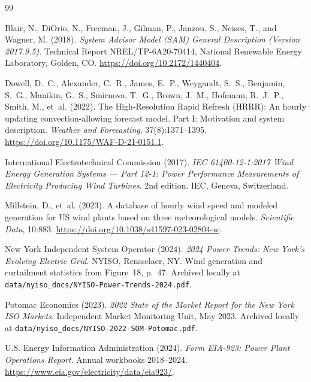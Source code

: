 \documentclass[11pt]{article}
\newcommand{\code}[1]{\texttt{\small #1}}
\begin{document}
\begin{thebibliography}{99}

Blair, N., DiOrio, N., Freeman, J., Gilman, P., Janzou, S., Neises,
T., and Wagner, M. (2018).
\emph{System Advisor Model (SAM) General Description (Version
2017.9.5)}.
Technical Report NREL/TP-6A20-70414, National Renewable Energy
Laboratory, Golden, CO.
\url{https://doi.org/10.2172/1440404}.

Dowell, D.~C., Alexander, C.~R., James, E.~P., Weygandt, S.~S.,
Benjamin, S.~G., Manikin, G.~S., Smirnova, T.~G., Brown, J.~M.,
Hofmann, R.~J.~P., Smith, M., et~al. (2022).
The High-Resolution Rapid Refresh (HRRR): An hourly updating
convection-allowing forecast model. Part I: Motivation and system
description.
\emph{Weather and Forecasting}, 37(8):1371--1395.
\url{https://doi.org/10.1175/WAF-D-21-0151.1}.

International Electrotechnical Commission (2017).
\emph{IEC 61400-12-1:2017 Wind Energy Generation Systems --- Part
12-1: Power Performance Measurements of Electricity Producing Wind
Turbines}.
2nd edition. IEC, Geneva, Switzerland.

Millstein, D., et~al. (2023).
A database of hourly wind speed and modeled generation for US wind
plants based on three meteorological models.
\emph{Scientific Data}, 10:883.
\url{https://doi.org/10.1038/s41597-023-02804-w}.

New York Independent System Operator (2024).
\emph{2024 Power Trends: New York's Evolving Electric Grid}.
NYISO, Rensselaer, NY.
Wind generation and curtailment statistics from Figure~18, p.~47.
Archived locally at \code{data/nyiso\_docs/NYISO-Power-Trends-2024.pdf}.

Potomac Economics (2023).
\emph{2022 State of the Market Report for the New York ISO Markets}.
Independent Market Monitoring Unit, May 2023.
Archived locally at \code{data/nyiso\_docs/NYISO-2022-SOM-Potomac.pdf}.

U.S. Energy Information Administration (2024).
\emph{Form EIA-923: Power Plant Operations Report}.
Annual workbooks 2018--2024.
\url{https://www.eia.gov/electricity/data/eia923/}.

\end{thebibliography}
\end{document}
